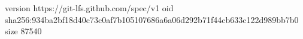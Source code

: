 version https://git-lfs.github.com/spec/v1
oid sha256:934ba2bf18d40c73c0af7b105107686a6a06d292b71f44cb633c122d989bb7b0
size 87540

